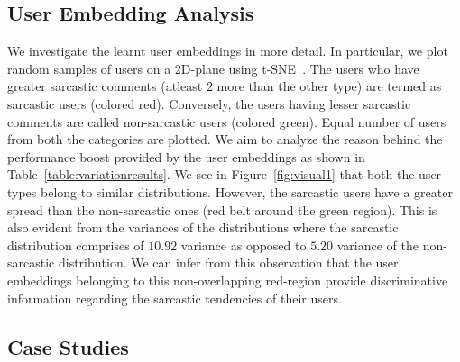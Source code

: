 \documentclass[11pt]{article}
\begin{document}
{\subsection{User Embedding Analysis} \label{sec:visualization}


We investigate the learnt user embeddings in more detail. In particular, we plot random samples of users on a 2D-plane using t-SNE~\cite{maaten2008visualizing}. The users who have greater sarcastic comments (atleast $2$ more than the other type) are termed as sarcastic users (colored red). Conversely, the users having lesser sarcastic comments are called non-sarcastic users (colored green). Equal number of users from both the categories are plotted. We aim to analyze the reason behind the performance boost provided by the user embeddings as shown in Table~\ref{table:variationresults}. We see in Figure~\ref{fig:visual1} that both the user types belong to similar distributions. However, the sarcastic users have a greater spread than the non-sarcastic ones (red belt around the green region). This is also evident from the variances of the distributions where the sarcastic distribution comprises of $10.92$ variance as opposed to $5.20$ variance of the non-sarcastic distribution. We can infer from this observation that the user embeddings belonging to this non-overlapping red-region provide discriminative information regarding the sarcastic tendencies of their users.

\subsection{Case Studies} \label{sec:casestudies}

}
\end{document}
